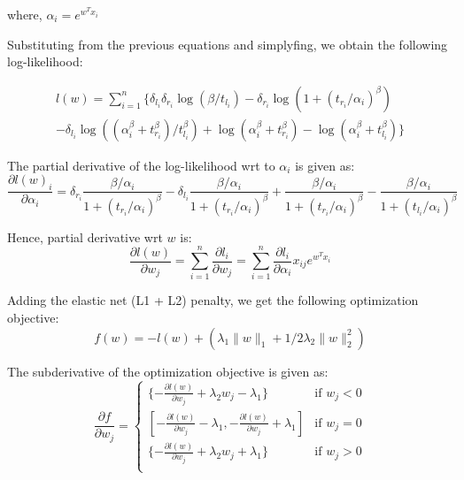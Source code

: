 \documentclass[12pt,a4paper]{report}
\begin{document}
where, $\alpha_i = e^{w^Tx_i}$ %

Substituting from the previous equations and simplyfing, we obtain the following log-likelihood:

\begin{equation} \label{lik0}
\begin{split}
l(w) = \sum_{i=1}^n \{{\delta_{l_i} \delta_{r_i}} \log(\beta / {t_{l_i}})
					 - {\delta_{r_i}} \log (1+ (t_{r_i}/\alpha_i)^{\beta}) \\
					 - {\delta_{l_i}} \log ((\alpha_i^{\beta} + t_{r_i}^{\beta}) / t_{l_i}^{\beta})
					 + \log (\alpha_i^{\beta} + t_{r_i}^{\beta}) - \log (\alpha_i^{\beta} + t_{l_i}^{\beta})
					 \}
\end{split}
\end{equation}

The partial derivative of the log-likelihood wrt to $\alpha_i$ is given as:
\begin{equation} \label{lld}
\frac{\partial{l(w)_i}}{\partial{\alpha_i}} = \delta_{r_i} \frac{\beta / \alpha_i} {1 + (t_{r_i} / \alpha_i) ^ \beta}
											  - \delta_{l_i} \frac{\beta / \alpha_i} {1 + (t_{r_i} / \alpha_i) ^ \beta}
											  + \frac{\beta / \alpha_i} {1 + (t_{r_i} / \alpha_i) ^ \beta}
											  - \frac{\beta / \alpha_i} {1 + (t_{l_i} / \alpha_i) ^ \beta}
\end{equation}

Hence, partial derivative wrt $w$ is:
\begin{equation} \label{lld}
\frac{\partial{l(w)}}{\partial{w_j}} = \sum_{i=1}^{n} \frac{\partial{l_i}}{\partial{w_j}}
									 = \sum_{i=1}^{n} \frac{\partial{l_i}}{\partial{\alpha_i}} x_{ij} e^{w^Tx_i}
\end{equation}

Adding the elastic net (L1 + L2) penalty, we get the following optimization objective:
\begin{equation} \label{objective}
f(w) = -l(w) + (\lambda_1 \|w\|_1 + 1/2 \lambda_2 \|w\|_2^2)
\end{equation}

The subderivative of the optimization objective is given as:
\begin{equation} \label{subderivative}
\frac{\partial{f}}{\partial{w_j}} = \begin{cases}
										\{-\frac{\partial{l(w)}}{\partial{w_j}} + \lambda_2 w_j -\lambda_1\} & \mbox{if }  w_j<0 \\
										[-\frac{\partial{l(w)}}{\partial{w_j}} -\lambda_1, -\frac{\partial{l(w)}}{\partial{w_j}} +\lambda_1] & \mbox{if }  w_j=0 \\
										\{-\frac{\partial{l(w)}}{\partial{w_j}} + \lambda_2 w_j +\lambda_1\} & \mbox{if } w_j>0 \\
									\end{cases}
\end{equation}
\end{document}
